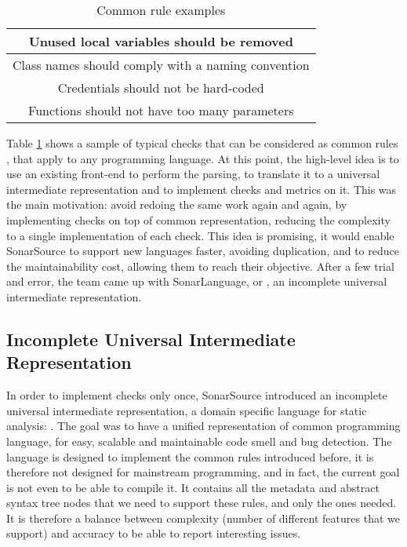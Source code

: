 \begin{table}[h]
\centering
\caption{Common rule examples}
\label{table:common_rules}
	\begin{tabular}{|c|}
		\hline
		Unused local variables should be removed  \\ \hline
		Class names should comply with a naming convention \\ \hline
		Credentials should not be hard-coded \\ \hline
		Functions should not have too many parameters \\ \hline
	\end{tabular}
\end{table}

Table \ref{table:common_rules} shows a sample of typical checks that can be considered as common rules \cite{JiraSonarSource:2019:Online}, that apply to any programming language.
At this point, the high-level idea is to use an existing front-end to perform the parsing, to translate it to a universal intermediate representation and to implement checks and metrics on it.
This was the main motivation: avoid redoing the same work again and again, by implementing checks on top of common representation, reducing the complexity to a single implementation of each check.
This idea is promising, it would enable SonarSource to support new languages faster, avoiding duplication, and to reduce the maintainability cost, allowing them to reach their objective.
After a few trial and error, the team came up with SonarLanguage, or \slang{}, an incomplete universal intermediate representation. 


\subsection{Incomplete Universal Intermediate Representation}
\label{subsec:slang}

In order to implement checks only once, SonarSource introduced an incomplete universal intermediate representation, a domain specific language for static analysis: \textbf{\slang{}}.
The goal was to have a unified representation of common programming language, for easy, scalable and maintainable code smell and bug detection. 
The language is designed to implement the common rules introduced before, it is therefore not designed for mainstream programming, and in fact, the current goal is not even to be able to compile it.
It contains all the metadata and abstract syntax tree nodes that we need to support these rules, and only the ones needed.
It is therefore a balance between complexity (number of different features that we support) and accuracy to be able to report interesting issues. 

